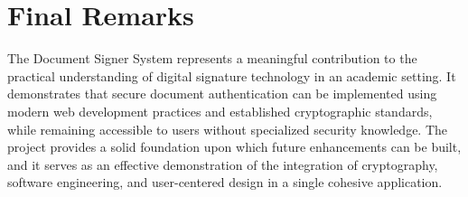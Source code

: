 \section{Final Remarks}

The Document Signer System represents a meaningful contribution to the practical understanding of digital signature technology in an academic setting. It demonstrates that secure document authentication can be implemented using modern web development practices and established cryptographic standards, while remaining accessible to users without specialized security knowledge. The project provides a solid foundation upon which future enhancements can be built, and it serves as an effective demonstration of the integration of cryptography, software engineering, and user-centered design in a single cohesive application.

